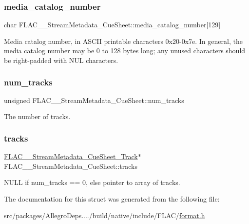 \subsubsection{\texorpdfstring{media\+\_\+catalog\+\_\+number}{media\_catalog\_number}}
{\footnotesize\ttfamily char F\+L\+A\+C\+\_\+\+\_\+\+Stream\+Metadata\+\_\+\+Cue\+Sheet\+::media\+\_\+catalog\+\_\+number\mbox{[}129\mbox{]}}

Media catalog number, in A\+S\+C\+II printable characters 0x20-\/0x7e. In general, the media catalog number may be 0 to 128 bytes long; any unused characters should be right-\/padded with N\+UL characters. \mbox{\label{struct_f_l_a_c_____stream_metadata___cue_sheet_a6924f26a8e8fa9023f23539b959fe2ae}} 
\subsubsection{\texorpdfstring{num\+\_\+tracks}{num\_tracks}}
{\footnotesize\ttfamily unsigned F\+L\+A\+C\+\_\+\+\_\+\+Stream\+Metadata\+\_\+\+Cue\+Sheet\+::num\+\_\+tracks}

The number of tracks. \mbox{\label{struct_f_l_a_c_____stream_metadata___cue_sheet_a5c0c3440b01b773684d56aeb1e424fab}} 
\subsubsection{\texorpdfstring{tracks}{tracks}}
{\footnotesize\ttfamily \hyperlink{struct_f_l_a_c_____stream_metadata___cue_sheet___track}{F\+L\+A\+C\+\_\+\+\_\+\+Stream\+Metadata\+\_\+\+Cue\+Sheet\+\_\+\+Track}$\ast$ F\+L\+A\+C\+\_\+\+\_\+\+Stream\+Metadata\+\_\+\+Cue\+Sheet\+::tracks}

N\+U\+LL if num\+\_\+tracks == 0, else pointer to array of tracks. 

The documentation for this struct was generated from the following file\+:\begin{DoxyCompactItemize}
\item 
src/packages/\+Allegro\+Deps..../build/native/include/\+F\+L\+A\+C/\hyperlink{format_8h}{format.\+h}\end{DoxyCompactItemize}

